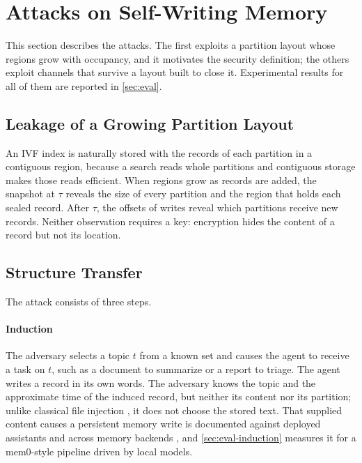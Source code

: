 \section{Attacks on Self-Writing Memory}
\label{sec:transfer}

This section describes the attacks. The first exploits a partition layout whose regions grow with
occupancy, and it motivates the security definition; the others exploit channels that
survive a layout built to close it. Experimental results for all of them are reported in
\cref{sec:eval}.

\subsection{Leakage of a Growing Partition Layout}

An IVF index is naturally stored with the records of each partition in a contiguous region,
because a search reads whole partitions and contiguous storage makes those reads efficient. When
regions grow as records are added, the snapshot at $\tau$ reveals the size of every partition and
the region that holds each sealed record. After $\tau$, the offsets of writes reveal which
partitions receive new records. Neither observation requires a key: encryption hides the
content of a record but not its location.

\subsection{Structure Transfer}

The attack consists of three steps.

\paragraph{Induction}
The adversary selects a topic $t$ from a known set and causes the agent to receive a task on $t$,
such as a document to summarize or a report to triage. The agent writes a record in its own words.
The adversary knows the topic and the approximate time of the induced record, but neither its
content nor its partition; unlike classical file injection \cite{zhang2016all}, it does not
choose the stored text. That supplied content causes a persistent memory write is documented
against deployed assistants \cite{rehberger2024spaiware,unit42memory} and across memory backends
\cite{das2026trojan}, and \cref{sec:eval-induction} measures it for a mem0-style pipeline
\cite{chhikara2025mem0} driven by local models.

